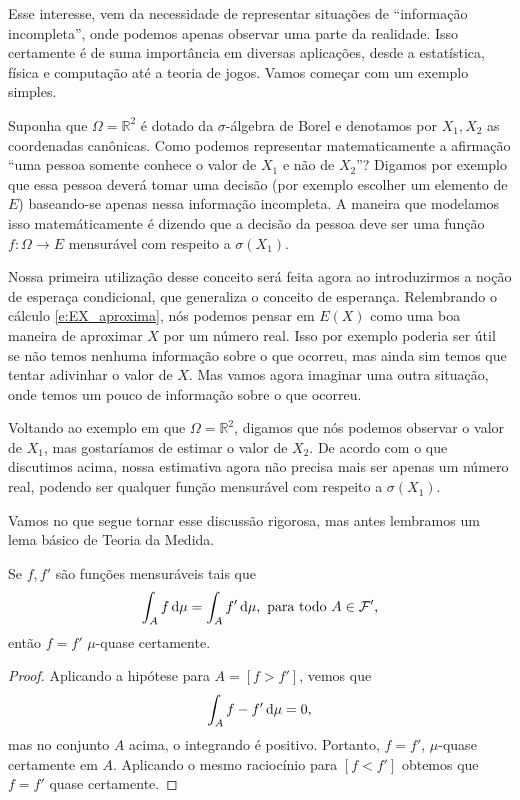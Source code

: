 Esse interesse, vem da necessidade de representar situações de ``informação incompleta'', onde podemos apenas observar uma parte da realidade.
Isso certamente é de suma importância em diversas aplicações, desde a estatística, física e computação até a teoria de jogos.
Vamos começar com um exemplo simples.

Suponha que $\Omega = \mathbb{R}^2$ é dotado da $\sigma$-álgebra de Borel e denotamos por $X_1, X_2$ as coordenadas canônicas.
Como podemos representar matematicamente a afirmação ``uma pessoa somente conhece o valor de $X_1$ e não de $X_2$''?
Digamos por exemplo que essa pessoa deverá tomar uma decisão (por exemplo escolher um elemento de $E$) baseando-se apenas nessa informação incompleta.
A maneira que modelamos isso matemáticamente é dizendo que a decisão da pessoa deve ser uma função $f: \Omega \to E$ mensurável com respeito a $\sigma(X_1)$.

Nossa primeira utilização desse conceito será feita agora ao introduzirmos a noção de esperaça condicional, que generaliza o conceito de esperança.
Relembrando o cálculo \eqref{e:EX_aproxima}, nós podemos pensar em $E(X)$ como uma boa maneira de aproximar $X$ por um número real.
Isso por exemplo poderia ser útil se não temos nenhuma informação sobre o que ocorreu, mas ainda sim temos que tentar adivinhar o valor de $X$.
Mas vamos agora imaginar uma outra situação, onde temos um pouco de informação sobre o que ocorreu.

Voltando ao exemplo em que $\Omega = \mathbb{R}^2$, digamos que nós podemos observar o valor de $X_1$, mas gostaríamos de estimar o valor de $X_2$.
De acordo com o que discutimos acima, nossa estimativa agora não precisa mais ser apenas um número real, podendo ser qualquer função mensurável com respeito a $\sigma(X_1)$.

Vamos no que segue tornar esse discussão rigorosa, mas antes lembramos um lema básico de Teoria da Medida.

\begin{lemma}
  \label{l:f_igual_fp}
  Se $f, f'$ são funções mensuráveis tais que
  \begin{equation}
    \int_A f \mathop{}\!\mathrm{d} \mu = \int_A f' \mathop{}\!\mathrm{d} \mu, \text{ para todo $A \in \mathcal{F}'$,}
  \end{equation}
  então $f = f'$ $\mu$-quase certamente.
\end{lemma}

\begin{proof}
  Aplicando a hipótese para $A = [f > f']$, vemos que
  \begin{equation}
    \int_A f - f' \mathop{}\!\mathrm{d} \mu = 0,
  \end{equation}
  mas no conjunto $A$ acima, o integrando é positivo.
  Portanto, $f = f'$, $\mu$-quase certamente em $A$.
  Aplicando o mesmo raciocínio para $[f < f']$ obtemos que $f = f'$ quase certamente.
\end{proof}

